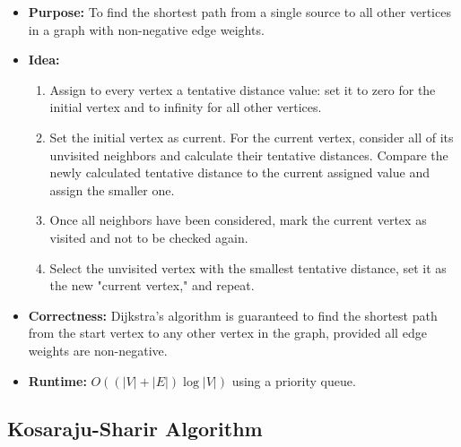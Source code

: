 \documentclass[landscape,7pt]{extarticle}
\begin{document}
\begin{multicols*}{3}
\begin{itemize}
    \item \textbf{Purpose:} To find the shortest path from a single source to all other vertices in a graph with non-negative edge weights.
    \item \textbf{Idea:}
    \begin{enumerate}
        \item Assign to every vertex a tentative distance value: set it to zero for the initial vertex and to infinity for all other vertices.
        \item Set the initial vertex as current. For the current vertex, consider all of its unvisited neighbors and calculate their tentative distances. Compare the newly calculated tentative distance to the current assigned value and assign the smaller one.
        \item Once all neighbors have been considered, mark the current vertex as visited and not to be checked again.
        \item Select the unvisited vertex with the smallest tentative distance, set it as the new "current vertex," and repeat.
    \end{enumerate}
    \item \textbf{Correctness:} Dijkstra's algorithm is guaranteed to find the shortest path from the start vertex to any other vertex in the graph, provided all edge weights are non-negative.
    \item \textbf{Runtime:} $O((|V|+|E|) \log |V|)$ using a priority queue.
\end{itemize}

\subsection*{Kosaraju-Sharir Algorithm}


\end{multicols*}
\end{document}
